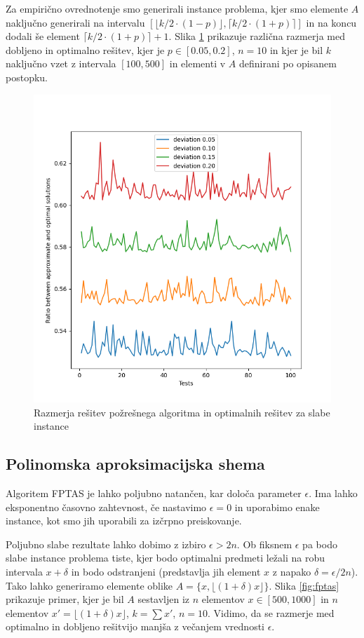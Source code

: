 \documentclass{article}
\begin{document}
Za empirično ovrednotenje smo generirali instance problema, kjer smo elemente
$A$ naključno generirali na intervalu $[\lfloor k/2 \cdot (1 - p) \rfloor,
\lceil k/2 \cdot (1 + p) \rceil]$ in na koncu dodali še element $\lceil k/2
\cdot (1 + p) \rceil + 1$. Slika \ref{fig:greedy} prikazuje različna razmerja
med dobljeno in optimalno rešitev, kjer je $p \in [0.05, 0.2]$, $n = 10$ in
kjer je bil $k$ naključno vzet z intervala $[100, 500]$ in elementi v $A$
definirani po opisanem postopku.

\begin{figure}
	\centering
	\includegraphics[width=0.9\linewidth]{figs/greedy-bad.png}
	\caption{Razmerja rešitev požrešnega algoritma in optimalnih rešitev za
		slabe instance}
	\label{fig:greedy}
\end{figure}


\subsection{Polinomska aproksimacijska shema}

Algoritem FPTAS je lahko poljubno natančen, kar določa parameter $\epsilon$. Ima
lahko eksponentno časovno zahtevnost, če nastavimo $\epsilon = 0$ in uporabimo
enake instance, kot smo jih uporabili za izčrpno preiskovanje.

Poljubno slabe rezultate lahko dobimo z izbiro  $\epsilon > 2n$. Ob fiksnem
$\epsilon$ pa bodo slabe instance problema tiste, kjer bodo optimalni predmeti
ležali na robu intervala $x + \delta$ in bodo odstranjeni (predstavlja jih
element $x$ z napako $\delta = \epsilon / 2n$). Tako lahko generiramo elemente
oblike $A = \{x, \lfloor(1 + \delta) x \rfloor \}$. Slika \ref{fig:fptas}
prikazuje primer, kjer je bil $A$ sestavljen iz $n$ elementov $x \in [500, 1000]$
in $n$ elementov $x' = \lfloor(1 + \delta) x \rfloor$, $k = \sum x'$, $n = 10$.
Vidimo, da se razmerje med optimalno in dobljeno rešitvijo manjša z večanjem
vrednosti $\epsilon$.
\end{document}
